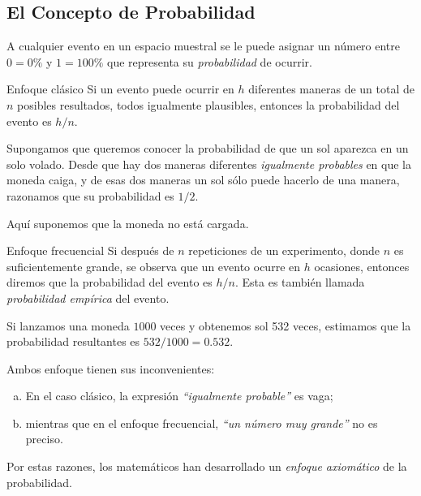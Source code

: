 \subsection{El Concepto de Probabilidad}
{}
A cualquier evento en un espacio muestral se le puede asignar un número entre $0=0\%$ y $1=100\%$ que representa su \emph{probabilidad} de ocurrir.

{Enfoque clásico}
Si un evento puede ocurrir en $h$ diferentes maneras de un total de $n$ posibles resultados, todos igualmente plausibles, entonces la probabilidad del evento es $h/n.$


 \begin{ejemplo}
  \label{exmp:1.10}
  Supongamos que queremos conocer la probabilidad de que un sol aparezca en un solo volado.  Desde que hay dos maneras diferentes \emph{igualmente probables} en que la moneda caiga,  y de esas dos maneras un sol sólo puede hacerlo de una manera, razonamos que su probabilidad es $1/2.$
    

  \begin{rem}
   Aquí suponemos que la moneda no está cargada.
  \end{rem}

 \end{ejemplo}


{Enfoque frecuencial}
Si después de $n$ repeticiones de un experimento, donde $n$ es suficientemente grande, se observa que un evento ocurre en $h$ ocasiones, entonces diremos que la probabilidad del evento es $h/n.$  Esta es también llamada \emph{probabilidad empírica} del evento.

{}
\begin{ejemplo}
 \label{exmp:1.11}
 Si lanzamos una moneda $1000$ veces y obtenemos sol 532 veces, estimamos que la probabilidad resultantes es $532/1000=0.532$.
\end{ejemplo}



 \begin{rem}
  Ambos enfoque tienen sus inconvenientes:
  \begin{enumerate}[(a)]
   \item En el caso clásico, la expresión \emph{``igualmente probable''} es vaga; 
   \item mientras que en el enfoque frecuencial, \emph{``un número muy grande''} no es preciso. 
  \end{enumerate}
Por estas razones, los matemáticos han desarrollado un \emph{enfoque axiomático} de la probabilidad.
 \end{rem}


